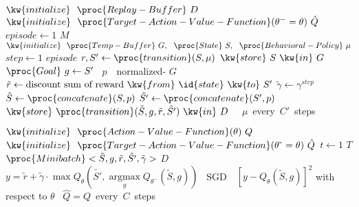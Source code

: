 \documentclass[11pt, a4paper]{article}
\DeclareMathOperator*{\argmax}{argmax}
\begin{document}
 \begin{codebox}
 \zi $\kw{initialize}~~\proc{Replay-Buffer}~D$
 \zi $\kw{initialize}~~\proc{Target-Action-Value-Function}(\theta^{-}=\theta)~\hat{Q}$
 \zi \For $episode\gets 1$ \To $M$ \Do
 \zi $\kw{initialize}~~\proc{Temp-Buffer}~G,~~\proc{State}~S,~~\proc{Behavioral-Policy}~\mu$
 \zi		\For  $step\gets 1$ \To $episode$ \Do
 \zi			$r,S'\gets\proc{transition}(S,\mu)$
 \zi			$\kw{store}~S~\kw{in}~G$
 \zi			$\proc{Goal}~g\gets S'$
 \zi			{}~$p$~~normalized-
 \zi         \For {}  $G$ \Do
 \zi				$\tilde{r}\gets \mbox{discount sum of reward}~\kw{from}~\id{state}~\kw{to}~S'$
 \zi				$\tilde{\gamma}\gets \gamma^{step}$
 \zi				$\tilde{S}\gets \proc{concatenate}(S,p)$
 \zi				$\tilde{S'}\gets\proc{concatenate}(S',p)$
 \zi				$\kw{store}~\proc{transition}(\tilde{S},g,\tilde{r},\tilde{S'})~\kw{in}~D$
 	 		\End
\zi	 		{}~~$\mu$~every~$C'$~steps
 		\End
 	\End
 \end{codebox}
%
\begin{codebox}
 \zi $\kw{initialize}~~\proc{Action-Value-Function}(\theta)~Q$
 \zi $\kw{initialize}~~\proc{Target-Action-Value-Function}(\theta^{\mbox{{}-}}=\theta)~\hat{Q}$
 \zi \For $t\gets 1$ \To $T$ \Do
 \zi	{} $\proc{Minibatch}<\tilde{S},g,\tilde{r},\tilde{S'},\tilde{\gamma}>$  $D$
 \zi $y=\tilde{r}+\tilde{\gamma}\cdot\max Q_{\theta}\left(\tilde{S'}, \argmax\limits_{g} Q_{\theta^{-}}(\tilde{S},g)\right)$
 \zi {}~SGD~~$[y-Q_{\theta}(\tilde{S},g)]^2$ with respect to $\theta$
 \zi {}~$\hat{Q}=Q$~every~$C$~steps
 \End
\end{codebox}
\end{document}
